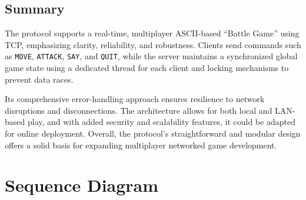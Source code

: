 \documentclass{article}
\begin{document}
\subsection{Summary}

The protocol supports a real-time, multiplayer ASCII-based ``Battle Game'' using TCP, emphasizing clarity, reliability, and robustness. Clients send commands such as \texttt{MOVE}, \texttt{ATTACK}, \texttt{SAY}, and \texttt{QUIT}, while the server maintains a synchronized global game state using a dedicated thread for each client and locking mechanisms to prevent data races.

Its comprehensive error-handling approach ensures resilience to network disruptions and disconnections. The architecture allows for both local and LAN-based play, and with added security and scalability features, it could be adapted for online deployment. Overall, the protocol's straightforward and modular design offers a solid basis for expanding multiplayer networked game development.

\section{Sequence Diagram}


\end{document}
